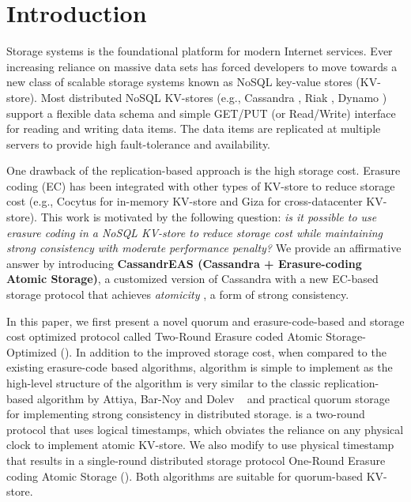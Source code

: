\section{Introduction}
\label{sec:intro}



Storage systems is the foundational platform for modern Internet services. Ever increasing reliance on massive data sets has forced developers to move towards a new class of scalable storage systems known as NoSQL key-value stores (KV-store). Most distributed NoSQL KV-stores (e.g., Cassandra \cite{Cassandra}, Riak \cite{Riak}, Dynamo \cite{Dynamo}) support a flexible data schema and simple GET/PUT (or Read/Write) interface for reading and writing data items. 
The data items are replicated at multiple servers to provide high fault-tolerance and availability. 

One drawback of the replication-based approach is the high storage cost. Erasure coding (EC) has been integrated with other types of KV-store to reduce storage cost (e.g., Cocytus \cite{Cocytus2016} for in-memory KV-store  and Giza \cite{GIZA2017} for cross-datacenter KV-store).
This work is motivated by the following question: \textit{is it possible to use erasure coding in a NoSQL KV-store to reduce storage cost while maintaining strong consistency with moderate performance penalty?} We provide an affirmative answer by introducing \textbf{CassandrEAS (Cassandra + Erasure-coding Atomic Storage)}, a customized version of Cassandra \cite{Cassandra} with a new EC-based storage protocol that achieves \textit{atomicity} \cite{lamport}, a form of strong consistency. 

In this paper, we first present a novel quorum and erasure-code-based and storage cost optimized protocol called Two-Round Erasure coded Atomic Storage-Optimized (\treasmod{}). In addition to the improved storage cost, when compared to the existing erasure-code based algorithms, \treasmod{} algorithm is simple to implement as the high-level structure of the algorithm is very similar to the classic replication-based algorithm by Attiya, Bar-Noy and Dolev ~\cite{ABD96} and practical quorum storage ~\cite{Dynamo,pbs-vldb2012} for implementing strong consistency in distributed storage. \treasmod{} is a two-round protocol that uses logical timestamps, which obviates the reliance on  any physical clock to implement atomic KV-store. We also modify \treasmod{} to use physical timestamp that results in a single-round distributed storage protocol One-Round Erasure coding Atomic Storage (\oreas). Both algorithms are suitable for quorum-based KV-store.%



